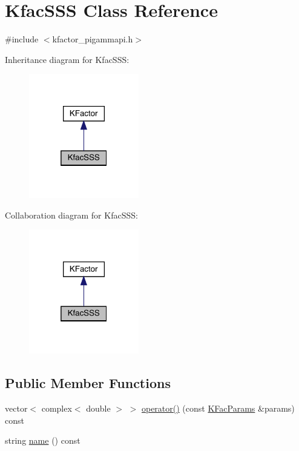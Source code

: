 \hypertarget{classKfacSSS}{}\section{Kfac\+S\+SS Class Reference}
\label{classKfacSSS}


{\ttfamily \#include $<$kfactor\+\_\+pigammapi.\+h$>$}



Inheritance diagram for Kfac\+S\+SS\+:
\nopagebreak
\begin{figure}[H]
\begin{center}
\leavevmode
\includegraphics[width=136pt]{db/d34/classKfacSSS__inherit__graph}
\end{center}
\end{figure}


Collaboration diagram for Kfac\+S\+SS\+:
\nopagebreak
\begin{figure}[H]
\begin{center}
\leavevmode
\includegraphics[width=136pt]{d6/dad/classKfacSSS__coll__graph}
\end{center}
\end{figure}
\subsection*{Public Member Functions}
\begin{DoxyCompactItemize}
\item 
vector$<$ complex$<$ double $>$ $>$ \mbox{\hyperlink{classKfacSSS_a25ca7daf4005bf951ad67d568e3f3936}{operator()}} (const \mbox{\hyperlink{classKFacParams}{K\+Fac\+Params}} \&params) const
\item 
string \mbox{\hyperlink{classKfacSSS_a2c22369b8bb0ac1be72f981c8c119719}{name}} () const
\end{DoxyCompactItemize}


